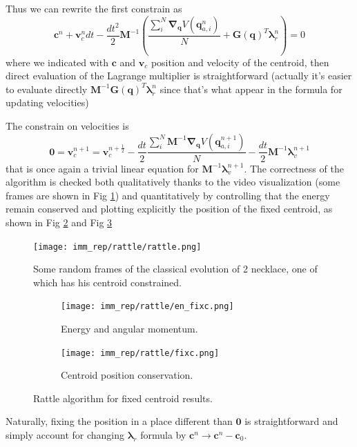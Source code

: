 \documentclass[10pt,a4paper]{article}
\begin{document}
Thus we can rewrite the first constrain as
\[\bm{c}^n+ \bm{v}_c^n dt - \frac{dt^2}{2} \bm{M}^{-1} \left(\frac{\sum_i^N  \bm{\nabla}_{\bm q}V(\bm{q}_{a,i}^n)}{N}  + \bm{G}(\bm{q})^T\bm{\lambda}_r^n \right) = 0 \]
where we indicated with $\bm{c}$ and $\bm{v}_c$ position and velocity of the centroid, then direct evaluation of the Lagrange multiplier is straightforward (actually it's easier to evaluate directly $ \bm{M}^{-1} \bm{G}(\bm{q})^T\bm{\lambda}_r^n$ since that's what appear in the formula for updating velocities)

The constrain on velocities is 
\[ \bm{0} = \bm{v}_c^{n+1} = \bm{v}_c^{n+\frac{1}{2}}-\frac{dt}{2}\frac{\sum_i^N  \bm{M}^{-1}\bm{\nabla}_{\bm q}V(\bm{q}_{a,i}^{n+1})}{N}-\frac{dt}{2} \bm{M}^{-1}\bm{\lambda}_v^{n+1}\]
that is once again a trivial linear equation for $\bm{M}^{-1}\bm{\lambda}_v^{n+1}$.
The correctness of the algorithm is checked both qualitatively thanks to the video visualization (some frames are shown in Fig \ref{fig: rattle}) and quantitatively by controlling that the energy remain conserved and plotting explicitly the position of the fixed centroid, as shown in Fig \ref{subfig: en_rat} and Fig \ref{subfig: cp}

\begin{figure}[h]
	\begin{center}
		\texttt{[image: imm\_rep/rattle/rattle.png]}
	\end{center}
	\caption{Some random frames of the classical evolution of 2 necklace, one of which has his centroid constrained.}
	\label{fig: rattle}
\end{figure}

\begin{figure}[h]
	\begin{center}
		\begin{subfigure}[b]{0.4\textwidth}
		\centering
		\texttt{[image: imm\_rep/rattle/en\_fixc.png]}
		\caption{Energy and angular momentum.}
		\label{subfig: en_rat}
	\end{subfigure}
	\begin{subfigure}[b]{0.4\textwidth}
		\centering
		\texttt{[image: imm\_rep/rattle/fixc.png]}
		\caption{Centroid position conservation.}
		\label{subfig: cp}
	\end{subfigure}
\caption{Rattle algorithm for fixed centroid results.}
\end{center}

	\label{fig: en_rat}
\end{figure}

Naturally, fixing the position in a place different than $\bm{0}$ is straightforward and simply account for changing $\bm{\lambda}_r$ formula by $\bm{c}^n \rightarrow \bm{c}^n-\bm{c}_0$.
\end{document}
